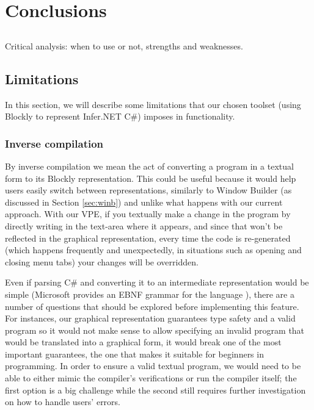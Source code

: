 \chapter{Conclusions} \label{chap:concl}

\section*{}

Critical analysis: when to use or not, strengths and weaknesses.

\section{Limitations}

In this section, we will describe some limitations that our chosen toolset (using
Blockly to represent Infer.NET C#) imposes in functionality.

\subsection{Inverse compilation}

By inverse compilation we mean the act of converting a program in a textual form
to its Blockly representation. This could be useful because it would help users
easily switch between representations, similarly to Window Builder (as discussed in Section \ref{sec:winb})
and unlike what happens with our current approach.
With our VPE, if you textually make a change in the program by directly
writing in the text-area where it appears,
and since that won't be reflected in the graphical representation, every time
the code is re-generated (which happens frequently and unexpectedly, in situations
such as opening and closing menu tabs) your changes will be overridden.

Even if parsing C# and converting it to an intermediate representation would be
simple (Microsoft provides an EBNF grammar for the language \cite{ebnfcs}), there
are a number of questions that should be explored before implementing this feature.
For instances, our graphical representation guarantees type safety and a valid
program so it would not make sense to allow specifying an invalid program that
would be translated into a graphical form, it would break one of the most important
guarantees, the one that makes it suitable for beginners in programming. In
order to ensure a valid textual program, we would need to be able to either mimic
the compiler's verifications or run the compiler itself; the first option is
a big challenge while the second still requires further investigation on how
to handle users' errors.

